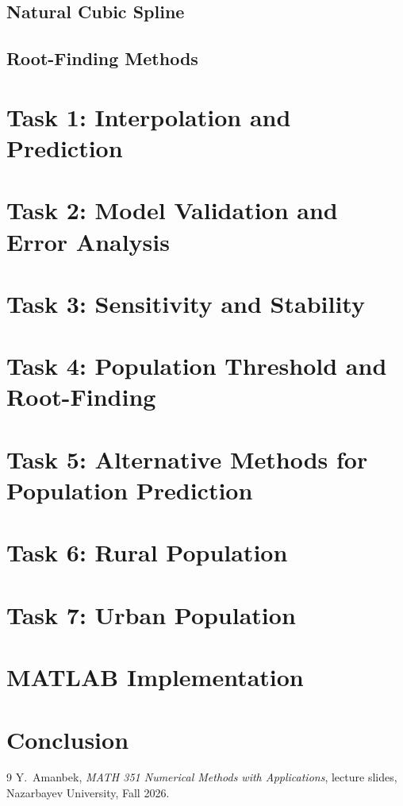 \documentclass[11pt,a4paper]{article}
\begin{document}
\subsection{Natural Cubic Spline}
\subsection{Root-Finding Methods}

\section{Task 1: Interpolation and Prediction}

\section{Task 2: Model Validation and Error Analysis}

\section{Task 3: Sensitivity and Stability}

\section{Task 4: Population Threshold and Root-Finding}

\section{Task 5: Alternative Methods for Population Prediction}

\section{Task 6: Rural Population}

\section{Task 7: Urban Population}

\section{MATLAB Implementation}

\section{Conclusion}

\begin{thebibliography}{9}
 Y.~Amanbek, \emph{MATH 351 Numerical Methods with Applications},
lecture slides, Nazarbayev University, Fall 2026.
\end{thebibliography}
\end{document}
